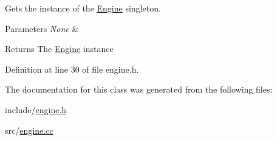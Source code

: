 Gets the instance of the \mbox{\hyperlink{classEngine}{Engine}} singleton. 


\begin{DoxyParams}{Parameters}
{\em None} & \\
\hline
\end{DoxyParams}
\begin{DoxyReturn}{Returns}
The \mbox{\hyperlink{classEngine}{Engine}} instance 
\end{DoxyReturn}


Definition at line 30 of file engine.\+h.



The documentation for this class was generated from the following files\+:\begin{DoxyCompactItemize}
\item 
include/\mbox{\hyperlink{engine_8h}{engine.\+h}}\item 
src/\mbox{\hyperlink{engine_8cc}{engine.\+cc}}\end{DoxyCompactItemize}
